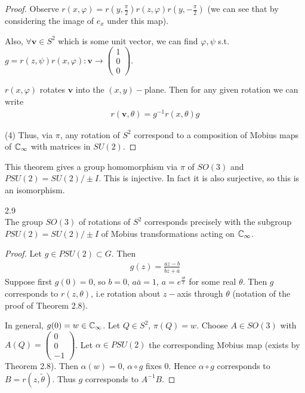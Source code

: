 \documentclass[a4paper]{article}
\begin{document}
\begin{thm}
\begin{proof}
Observe $r(x,\varphi) = r(y,\frac{\pi}{2})r(z,\varphi)r(y,-\frac{\pi}{2})$ (we can see that by considering the image of $e_x$ under this map).

Also, $\forall\mathbf{v} \in S^2$ which is some unit vector, we can find $\varphi,\psi$ s.t. $g=r(z,\psi)r(x,\varphi):\mathbf{v} \to \left(\begin{matrix}
1\\0\\0
\end{matrix}\right)$.

$r(x,\varphi)$ rotates $\mathbf{v}
$ into the $(x,y)-$plane. Then for any given rotation we can write
\begin{equation*}
\begin{aligned}
r(\mathbf{v},\theta) = g^{-1} r(x,\theta) g
\end{aligned}
\end{equation*}

(4) Thus, via $\pi$, any rotation of $S^2$ correspond to a composition of M$\ddot{o}$bius maps of $\mathbb{C}_\infty$ with matrices in $SU(2)$.
\end{proof}
\end{thm}

This theorem gives a group homomorphism via $\pi$ of $SO(3)$ and $PSU(2) = SU(2) / \pm I$. This is injective. In fact it is also surjective, so this is an isomorphism.

\begin{thm} 2.9\\
The group $SO(3)$ of rotations of $S^2$ corresponds precisely with the subgroup $PSU(2) = SU(2) / \pm I$ of M$\ddot{o}$bius transformations acting on $\mathbb{C}_\infty$.
\begin{proof}
Let $g \in PSU(2) \subset G$. Then
\begin{equation*}
\begin{aligned}
g(z) = \frac{az-b}{\bar{b}z+\bar{a}}
\end{aligned}
\end{equation*}
Suppose first $g(0)=0$, so $b=0$, $a\bar{a} = 1$, $a=e^{\frac{i\theta}{2}}$ for some real $\theta$. Then $g$ corresponds to $r(z,\theta)$, i.e rotation about $z-$axis through $\theta$ (notation of the proof of Theorem 2.8).

In general, $g(0) = w \in \mathbb{C}_\infty$. Let $Q \in S^2$, $\pi(Q) = w$. Choose $A \in SO(3)$ with $A(Q) = \left(\begin{matrix}
0\\
0\\
-1
\end{matrix}\right)$. Let $\alpha \in PSU(2)$ the corresponding M$\ddot{o}$bius map (exists by Theorem 2.8). Then $\alpha(w)=0$, $\alpha \circ g$ fixes $0$. Hence $\alpha \circ g$ corresponds to $B = r(z,\tilde{\theta})$. Thus $g$ corresponds to $A^{-1}B$.
\end{proof}
\end{thm}
\end{document}
